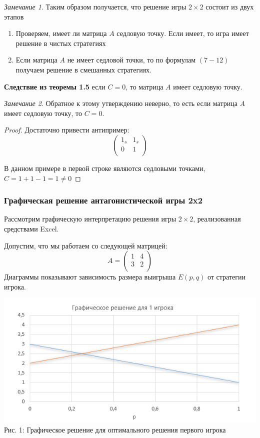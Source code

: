 \documentclass[aps,%
12pt,%
final,%
oneside,
onecolumn,%
musixtex, %
superscriptaddress,%
centertags]{article} %
\theoremstyle{plain}
\theoremstyle{definition}
\theoremstyle{remark}
\newtheorem{remark}{Замечание}[section]
\begin{document}
\begin{remark}
  Таким образом получается, что решение игры $2 \times 2$ состоит из двух этапов
  \begin{enumerate}
    \item Проверяем, имеет ли матрица $A$ седловую точку. Если имеет, то игра имеет решение в чистых стратегиях
    \item Если матрица $A$ не имеет седловой точки, то по формулам $(7-12)$ получаем решение в смешанных стратегиях.
  \end{enumerate}
\end{remark}

\textbf{Следствие из теоремы 1.5} если $C = 0$, то матрица $A$ имеет седловую точку.

\begin{remark}
  Обратное к этому утверждению неверно, то есть если матрица $A$ имеет седловую точку, то $C=0$.
\end{remark}
\begin{proof}
  Достаточно привести антипример:
  $$ \begin{pmatrix} 1_{s} & 1_{s} \\ 0 & 1 \\ \end{pmatrix} $$

  В данном примере в первой строке являются седловыми точками, $C = 1+1 -1 = 1 \neq 0$
\end{proof}

\subsubsection{Графическая решение антагонистической игры 2x2}

Рассмотрим графическую интерпретацию решения игры $2 \times 2$, реализованная средствами Excel.

Допустим, что мы работаем со следующей матрицей:
$$A = \begin{pmatrix} 1 & 4 \\ 3 & 2 \\ \end{pmatrix} $$
Диаграммы показывают зависимость размера выигрыша $E(p,q)$ от стратегии игрока.

\begin{center}
  \includegraphics[scale=0.6]{images/1.png}
  Рис. 1: Графическое решение для оптимального решения первого игрока
\end{center}
\end{document}
